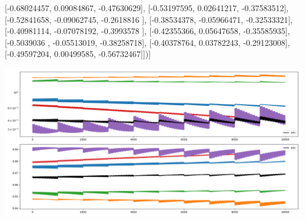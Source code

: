\documentclass{article}
\begin{document}
       [-0.68024457,  0.09084867, -0.47630629],
       [-0.53197595,  0.02641217, -0.37583512],
       [-0.52841658, -0.09062745, -0.2618816 ],
       [-0.38534378, -0.05966471, -0.32533321],
       [-0.40981114, -0.07078192, -0.3993578 ],
       [-0.42355366,  0.05647658, -0.35585935],
       [-0.5039036 , -0.05513019, -0.38258718],
       [-0.40378764,  0.03782243, -0.29123008],
       [-0.49597204,  0.00499585, -0.56732467]])]
\begin{center}
\includegraphics[scale=.9]{control_dpn_all.png}

\end{center}
\end{document}
